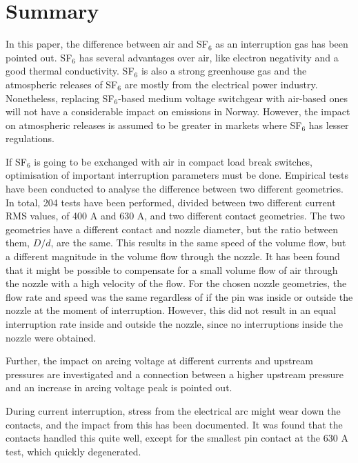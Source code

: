 \documentclass[10pt,a4paper,twoside]{article}
\begin{document}
\thispagestyle{empty}
\cleardoublepage

\section*{Summary}
\setcounter{page}{1}

In this paper, the difference between air and SF$_6$ as an interruption gas has been pointed out. SF$_6$ has several advantages over air, like electron negativity and a good thermal conductivity. SF$_6$ is also a strong greenhouse gas and the atmospheric releases of SF$_6$ are mostly from the electrical power industry. Nonetheless, replacing SF$_6$-based medium voltage switchgear with air-based ones will not have a considerable impact on emissions in Norway. However, the impact on atmospheric releases is assumed to be greater in markets where SF$_6$ has lesser regulations.

If SF$_6$ is going to be exchanged with air in compact load break switches, optimisation of important interruption parameters must be done. Empirical tests have been conducted to analyse the difference between two different geometries. In total, 204 tests have been performed, divided between two different current RMS values, of 400 A and 630 A, and two different contact geometries. The two geometries have a different contact and nozzle diameter, but the ratio between them, $D/d$, are the same. This results in the same speed of the volume flow, but a different magnitude in the volume flow through the nozzle. It has been found that it might be possible to compensate for a small volume flow of air through the nozzle with a high velocity of the flow. For the chosen nozzle geometries, the flow rate and speed was the same regardless of if the pin was inside or outside the nozzle at the moment of interruption. However, this did not result in an equal interruption rate inside and outside the nozzle, since no interruptions inside the nozzle were obtained.

Further, the impact on arcing voltage at different currents and upstream pressures are investigated and a connection between a higher upstream pressure and an increase in arcing voltage peak is pointed out.

During current interruption, stress from the electrical arc might wear down the contacts, and the impact from this has been documented. It was found that the contacts handled this quite well, except for the smallest pin contact at the 630 A test, which quickly degenerated.
\end{document}

